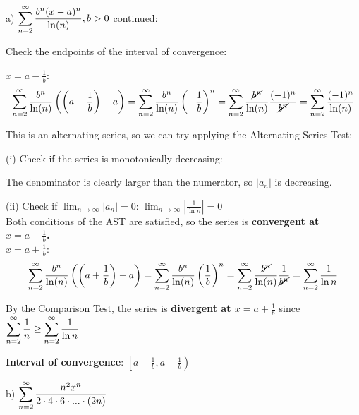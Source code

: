 \documentclass[12pt]{article}
\begin{document}
\begin{solution} 

a) $\mathlarger{\sum_{n=2}^{\infty} \frac{b^{n}(x-a)^{n}}{\ln(n)}}, b > 0$ continued:

Check the endpoints of the interval of convergence:

$x = a - \frac{1}{b}$:
$$ \sum_{n=2}^{\infty} \frac{b^{n}}{\ln (n)}\left(\left(a - \frac{1}{b} \right)- a\right) = \sum_{n=2}^{\infty} \frac{b^{n}}{\ln(n)} \left(- \frac{1}{b} \right)^{n}  = \sum_{n=2}^{\infty} \frac{\cancel{b^{n}}}{\ln(n)} \frac{(-1)^n}{\cancel{b^n}} = \sum_{n=2}^{\infty} \frac{(-1)^n}{\ln(n)} $$


This is an alternating series, so we can try applying the Alternating Series Test:


(i) Check if the series is monotonically decreasing: 

\begin{addmargin}[1.25em]{2em}
The denominator is clearly larger than the numerator, so $\left| a_n \right|$ is decreasing.
\end{addmargin}


(ii) Check if $\lim_{n \to \infty} \left| a_n \right| = 0$:
$\lim_{n \to \infty} \left| \frac{1}{\ln n}\right| = 0$ ~\\
Both conditions of the AST are satisfied, so the series is \textbf{convergent at $x = a - \frac{1}{b}$.} ~\\

$x = a + \frac{1}{b}$:
$$ \sum_{n=2}^{\infty} \frac{b^{n}}{\ln (n)}\left(\left(a + \frac{1}{b} \right)- a\right) = \sum_{n=2}^{\infty} \frac{b^{n}}{\ln(n)} \left( \frac{1}{b} \right)^{n} = \sum_{n=2}^{\infty} \frac{\cancel{b^{n}}}{\ln(n)} \frac{1}{\cancel{b^n}} = \sum_{n=2}^{\infty} \frac{1}{\ln n} $$

By the Comparison Test, the series is \textbf{divergent at $x = a + \frac{1}{b}$} since $\mathlarger{\sum^{\infty}_{n=2} \frac{1}{n} \geq \sum^{\infty}_{n=2} \frac{1}{\ln n}}$

\textbf{Interval of convergence}: $\left[a - \frac{1}{b}, a + \frac{1}{b} \right)$ 

\end{solution}

b) $\mathlarger{\sum_{n=2}^{\infty} \frac{n^{2}x^{n}}{2\cdot 4 \cdot 6 \cdot ... \cdot (2n)}}$
\end{document}
